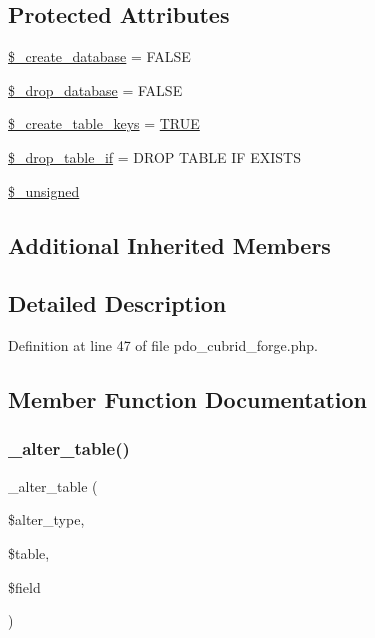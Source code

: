 \subsection*{Protected Attributes}
\begin{DoxyCompactItemize}
\item 
\mbox{\hyperlink{class_c_i___d_b__pdo__cubrid__forge_acd23c9a8735806155f1a5d0a87c151f2}{\$\+\_\+create\+\_\+database}} = F\+A\+L\+SE
\item 
\mbox{\hyperlink{class_c_i___d_b__pdo__cubrid__forge_a8305b12fc17f6f87778260ebdff287b4}{\$\+\_\+drop\+\_\+database}} = F\+A\+L\+SE
\item 
\mbox{\hyperlink{class_c_i___d_b__pdo__cubrid__forge_a73e07acdd35c948ad353903c2827af6e}{\$\+\_\+create\+\_\+table\+\_\+keys}} = \mbox{\hyperlink{constants_8php_ae04a3efe6aa42044f803ee90c2277846}{T\+R\+UE}}
\item 
\mbox{\hyperlink{class_c_i___d_b__pdo__cubrid__forge_a92a8a9145a7fc91e252e58d019373581}{\$\+\_\+drop\+\_\+table\+\_\+if}} = \textquotesingle{}D\+R\+OP T\+A\+B\+LE IF E\+X\+I\+S\+TS\textquotesingle{}
\item 
\mbox{\hyperlink{class_c_i___d_b__pdo__cubrid__forge_aae977ae6d61fa183f0b25422b6ddc31c}{\$\+\_\+unsigned}}
\end{DoxyCompactItemize}
\subsection*{Additional Inherited Members}


\subsection{Detailed Description}


Definition at line 47 of file pdo\+\_\+cubrid\+\_\+forge.\+php.



\subsection{Member Function Documentation}
\mbox{\label{class_c_i___d_b__pdo__cubrid__forge_a41c6cae02f2fda8b429ad0afb9509426}} 
\subsubsection{\texorpdfstring{\_alter\_table()}{\_alter\_table()}}
{\footnotesize\ttfamily \+\_\+alter\+\_\+table (\begin{DoxyParamCaption}\item[{}]{\$alter\+\_\+type,  }\item[{}]{\$table,  }\item[{}]{\$field }\end{DoxyParamCaption})\hspace{0.3cm}{\ttfamily [protected]}}


